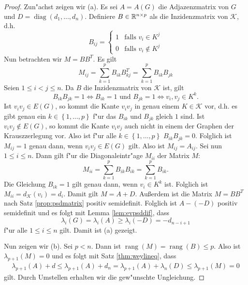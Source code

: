 \begin{proof}
  Zun"achst zeigen wir (a). Es sei $A=A(G)$ die Adjazenzmatrix von $G$ und $D = \operatorname{diag}(d_1,\dots,d_n)$. Definiere $B\in{\mathbb{R}}^{n\times p}$ als die Inzidenzmatrix von $\mathcal K$, d.h. $$B_{ij} = \begin{cases}
    1 & \text{falls } v_i \in K^j \\ 0 & \text{falls }v_i \notin K^j
  \end{cases}$$ 
  Nun betrachten wir $M=BB^{T}$. Es gilt
  \[
    M_{ij} = \sum\limits_{k=1}^{p}B_{ik}B^{T}_{kj} = \sum\limits_{k=1}^{p}B_{ik}B_{jk}
  \]
  Seien $1\leq i < j \leq n$. Da $B$ die Inzidenzmatrix von $\mathcal{K}$ ist, gilt  $$ B_{ik} B_{jk} = 1 \Leftrightarrow B_{ik} = 1 \text{ und } B_{jk} = 1 \Leftrightarrow v_i,v_j \in K^{k}.$$ Ist $v_iv_j \in E(G)$, so kommt die Kante $v_iv_j$ in genau einem $K\in \mathcal{K}$ vor, d.h. es gibt genau ein $k\in \left\{ 1,\dots,p \right\}$ f"ur das $B_{ik}$ und $B_{jk}$ gleich $1$ sind. Ist $v_iv_j\notin E(G)$, so kommt die Kante $v_iv_j$ auch nicht in einem der Graphen der Krauszzerlegung vor.
  Also ist f"ur alle $k\in \left\{ 1,\dots, p \right\}$ $B_{ik}B_{jk} = 0$. Folglich ist $M_{ij}=1$ genau dann, wenn $v_iv_j\in E(G)$ gilt. Also ist $M_{ij} = A_{ij}$.
  Sei nun $1\leq i \leq n$. Dann gilt f"ur die Diagonaleintr"age $M_{ii}$ der Matrix $M$:
  \[
    M_{ii} = \sum\limits_{k=1}^{p}B_{ik}B_{ik} = \sum\limits_{k=1}^{p} B_{ik}.
  \]
  Die Gleichung $B_{ik}=1$ gilt genau dann, wenn $v_i \in K^k$ ist. Folglich ist $M_{ii}= d_{\mathcal{K}}(v_i)= d_i$. Damit gilt $M=A+D$. Au{\ss}erdem ist die Matrix $M=BB^{T}$ nach Satz \ref{prop:psdmatrix} positiv semidefinit.
  Folglich ist $A- (-D)$ positiv semidefinit und es folgt mit Lemma \ref{lem:evpsddif}, dass 
  \begin{equation*}
    \lambda_i(G) = \lambda_i(A) \geq \lambda_i(-D) = -d_{n-i+1}
  \end{equation*}
  f"ur alle $1 \leq i \leq n$ gilt. 
  Damit ist (a) gezeigt.

  Nun zeigen wir (b). Sei $p<n$. Dann ist $\operatorname{rang}(M)= \operatorname{rang}(B) \leq p$. Also ist $\lambda_{p+1}(M) = 0$ und es folgt mit Satz \ref{thm:weylineq}, dass 
  \begin{align*}
    \lambda_{p+1}(A) + d \leq \lambda_{p+1}(A) + d_{n} = \lambda_{p+1}(A) + \lambda_{n} (D) \leq \lambda_{p+1} (M) = 0
  \end{align*}
  gilt.
  Durch Umstellen erhalten wir die gew"unschte Ungleichung.
\end{proof}

